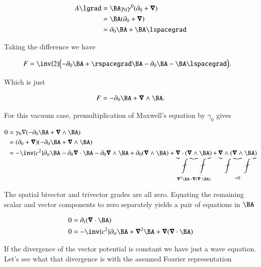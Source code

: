 \begin{align*}
A \lgrad
&= 
\BA \gamma_0 \gamma^0 ( \partial_0 + \spacegrad ) \\
&= 
\BA ( \partial_0 + \spacegrad ) \\
&= 
\partial_0 \BA 
+ \BA \lspacegrad 
\end{align*}

Taking the difference we have

\begin{align*}
F 
&= 
\inv{2} \Bigl( -\partial_0 \BA + \rspacegrad \BA -  \partial_0 \BA - \BA \lspacegrad \Bigr).
\end{align*}

Which is just

\begin{align}\label{eqn:fourierMaxVac:44}
F = -\partial_0 \BA + \spacegrad \wedge \BA.
\end{align}

For this vacuum case, premultiplication of Maxwell's equation by $\gamma_0$ gives

\begin{align*}
0 
&= \gamma_0 \grad ( -\partial_0 \BA + \spacegrad \wedge \BA ) \\
&= (\partial_0 + \spacegrad)( -\partial_0 \BA + \spacegrad \wedge \BA ) \\
&= -\inv{c^2} \partial_{tt} \BA 
- \partial_0 \spacegrad \cdot \BA 
- \partial_0 \spacegrad \wedge \BA 
+ \partial_0 ( \spacegrad \wedge \BA ) 
+ \underbrace{\spacegrad \cdot ( \spacegrad \wedge \BA ) }_{\spacegrad^2 \BA - \spacegrad (\spacegrad \cdot \BA)}
+ \underbrace{\spacegrad \wedge ( \spacegrad \wedge \BA )}_{=0} \\
\end{align*}

The spatial bivector and trivector grades are all zero.  Equating the remaining scalar and vector components to zero separately yields a pair of equations in $\BA$

\begin{subequations}
\label{eqn:fourierMaxVac:45}
\begin{align}
0 &= \partial_t (\spacegrad \cdot \BA) \\
0 &= -\inv{c^2} \partial_{tt} \BA + \spacegrad^2 \BA + \spacegrad (\spacegrad \cdot \BA) 
\end{align}
\end{subequations}

If the divergence of the vector potential is constant we have just a wave equation.  Let's see what that divergence is with the assumed Fourier representation

